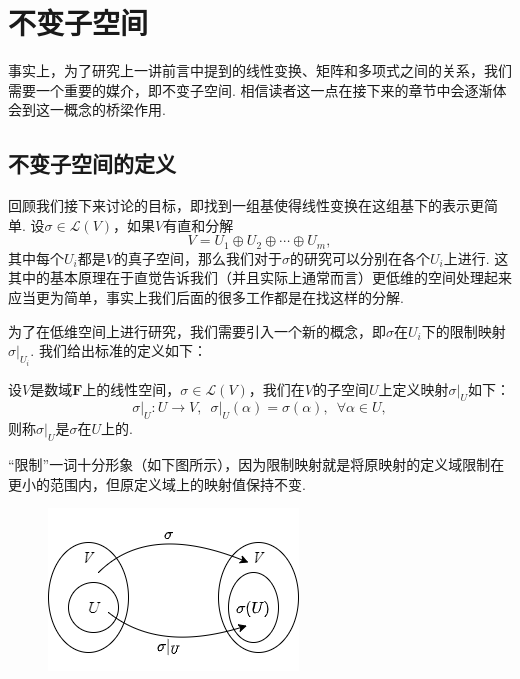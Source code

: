 \chapter{不变子空间}

事实上，为了研究上一讲前言中提到的线性变换、矩阵和多项式之间的关系，我们需要一个重要的媒介，即不变子空间. 相信读者这一点在接下来的章节中会逐渐体会到这一概念的桥梁作用.

\section{不变子空间的定义}

回顾我们接下来讨论的目标，即找到一组基使得线性变换在这组基下的表示更简单. 设$\sigma\in\mathcal{L}(V)$，如果$V$有直和分解
\begin{equation}\label{eq:18:直和分解}
    V=U_1\oplus U_2\oplus\cdots\oplus U_m,
\end{equation}
其中每个$U_i$都是$V$的真子空间，那么我们对于$\sigma$的研究可以分别在各个$U_i$上进行. 这其中的基本原理在于直觉告诉我们（并且实际上通常而言）更低维的空间处理起来应当更为简单，事实上我们后面的很多工作都是在找这样的分解.

为了在低维空间上进行研究，我们需要引入一个新的概念，即$\sigma$在$U_i$下的限制映射$\sigma\vert_{U_i}$. 我们给出标准的定义如下：
\begin{definition} 
    设$V$是数域$\mathbf{F}$上的线性空间，$\sigma\in\mathcal{L}(V)$，我们在$V$的子空间$U$上定义映射$\sigma\vert_U$如下：
    \[\sigma\vert_U:U\to V,\enspace\sigma\vert_U(\alpha)=\sigma(\alpha),\enspace\forall \alpha\in U,\]
    则称$\sigma\vert_U$是$\sigma$在$U$上的.
\end{definition}

``限制''一词十分形象（如下图所示），因为限制映射就是将原映射的定义域限制在更小的范围内，但原定义域上的映射值保持不变.
\begin{figure}[H]
    \centering
    \includegraphics[scale=0.7]{figs/18-1.png}
\end{figure}

